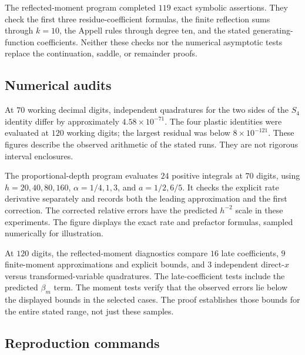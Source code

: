 The reflected-moment program completed $119$ exact symbolic assertions.
They check the first three residue-coefficient formulas, the finite
reflection sums through $k=10$, the Appell rules through degree ten,
and the stated generating-function coefficients. Neither these checks
nor the numerical asymptotic tests replace the continuation, saddle,
or remainder proofs.

\subsection{Numerical audits}

At $70$ working decimal digits, independent quadratures for the two
sides of the $S_4$ identity differ by approximately
$4.58\times10^{-71}$. The four plastic identities were evaluated at
$120$ working digits; the largest residual was below
$8\times10^{-121}$. These figures describe the observed arithmetic
of the stated runs. They are not rigorous interval enclosures.

The proportional-depth program evaluates $24$ positive integrals at
$70$ digits, using $h=20,40,80,160$, $\alpha=1/4,1,3$, and
$a=1/2,6/5$. It checks the explicit rate derivative separately and
records both the leading approximation and the first correction.
The corrected relative errors have the predicted $h^{-2}$ scale in
these experiments. The figure displays the exact rate and prefactor
formulas, sampled numerically for illustration.

At $120$ digits, the reflected-moment diagnostics compare $16$ late
coefficients, $9$ finite-moment approximations and explicit bounds,
and $3$ independent direct-$x$ versus transformed-variable quadratures.
The late-coefficient tests include the predicted $\beta_m$ term.
The moment tests verify that the observed errors lie below the
displayed bounds in the selected cases. The proof establishes those
bounds for the entire stated range, not just these samples.

\subsection{Reproduction commands}

